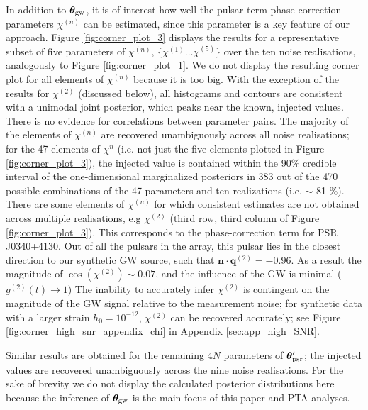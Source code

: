 \documentclass[fleqn,usenatbib,useAMS]{mnras}
\begin{document}
In addition to $\boldsymbol{\theta}_{\rm gw}$, it is of interest how well the pulsar-term phase correction parameters $\chi^{(n)}$ can be estimated, since this parameter is a key feature of our approach. Figure \ref{fig:corner_plot_3} displays the results for a representative subset of five parameters of $\chi^{(n)}$, $ \{\chi^{(1)} \dots \chi^{(5)} \}$ over the ten noise realisations, analogously to Figure \ref{fig:corner_plot_1}. We do not display the resulting corner plot for all elements of $\chi^{(n)}$ because it is too big. With the exception of the results for $\chi^{(2)}$ (discussed below), all histograms and contours are consistent with a unimodal joint posterior, which peaks near the known, injected values. There is no evidence for correlations between parameter pairs. The majority of the elements of $\chi^{(n)}$ are recovered unambiguously across all noise realisations; for the 47 elements of $\chi^{n}$ (i.e. not just the five elements plotted in Figure \ref{fig:corner_plot_3}), the injected value is  contained within the 90\% credible interval of the one-dimensional marginalized posteriors in 383 out of the 470 possible combinations of the 47 parameters and ten realizations (i.e. $\sim$ 81 $\%$). There are some elements of $\chi^{(n)}$ for which consistent estimates are not obtained across multiple realisations, e.g $\chi^{(2)}$ (third row, third column of Figure \ref{fig:corner_plot_3}). This corresponds to the phase-correction term for PSR J0340+4130. Out of all the pulsars in the array, this pulsar lies in the closest direction to our synthetic GW source, such that $\boldsymbol{n} \cdot \boldsymbol{q}^{(2)} = -0.96$. As a result the magnitude of $\cos \left( \chi^{(2)}\right) \sim 0.07$, and the influence of the GW is minimal ($g^{(2)}(t) \to 1$) The inability to accurately infer $\chi^{(2)}$ is contingent on the magnitude of the GW signal relative to the measurement noise; for synthetic data with a larger strain $h_0 = 10^{-12}$, $\chi^{(2)}$ can be recovered accurately; see Figure \ref{fig:corner_high_snr_appendix_chi} in Appendix \ref{sec:app_high_SNR}. \newline 

Similar results are obtained for the remaining 4$N$ parameters of $\boldsymbol{\theta}_{\rm psr}'$; the injected values are recovered unambiguously across the nine noise realisations. For the sake of brevity we do not display the calculated posterior distributions here because the inference of $\boldsymbol{\theta}_{\rm gw}$ is the main focus of this paper and PTA analyses. \newline 
\end{document}
